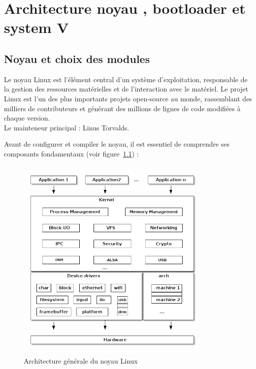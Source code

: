 \chapter{Architecture noyau , bootloader et  system V}
\minitoc
\clearpage
\section{Noyau et choix des modules}
\label{subsec:noyau-modules}

Le noyau Linux est l’élément central d’un système d’exploitation, responsable de la gestion des ressources matérielles et de l’interaction avec le matériel. Le projet Linux est l’un des plus importants projets open-source au monde, rassemblant des milliers de contributeurs et générant des millions de lignes de code modifiées à chaque version. \\ 
Le mainteneur principal : Linus Torvalds.


Avant de configurer et compiler le noyau, il est essentiel de comprendre ses composants fondamentaux (voir figure~\textcolor{blue}{\ref{fig:kernel-arch}}) :

\begin{figure}[H]
  \centering
  \includegraphics[width=0.85\textwidth]{images_pfe/kernelarchitecture.png}
  \caption{Architecture générale du noyau Linux}
  \label{fig:kernel-arch}
\end{figure}

